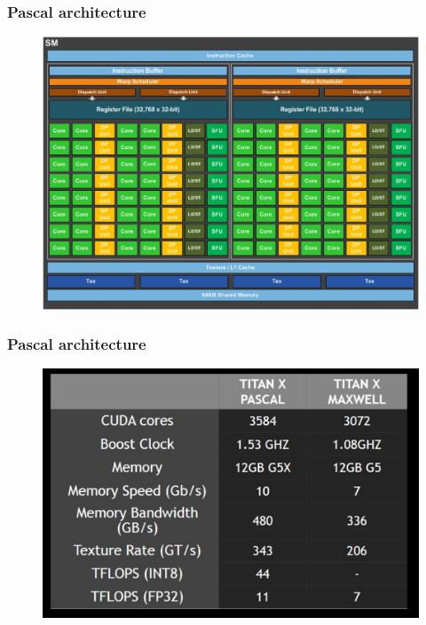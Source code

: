 \documentclass{beamer}
\begin{document}
\begin{frame}
\frametitle{Pascal architecture}
\begin{figure}
	\centering
	\includegraphics[scale=0.6]{pascal6}
\end{figure}

\end{frame}

\begin{frame}
\frametitle{Pascal architecture}
\begin{figure}
	\centering
	\includegraphics[scale=0.3]{pascal8}
\end{figure}

\end{frame}
\end{document}
